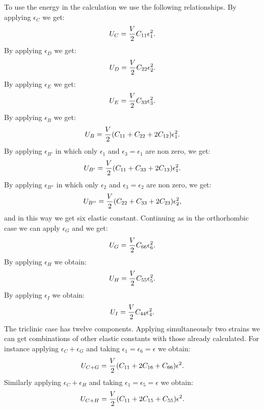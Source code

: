 \documentclass[12pt,a4paper,twoside]{report}
\begin{document}
To use the energy in the calculation we use the following
relationships. By applying $\epsilon_C$ we get:
\begin{equation}
U_C= {V \over 2} C_{11} \epsilon_1^2.
\end{equation}
By applying $\epsilon_D$ we get:
\begin{equation}
U_D= {V \over 2} C_{22} \epsilon_2^2.
\end{equation}
By applying $\epsilon_E$ we get:
\begin{equation}
U_E= {V \over 2} C_{33} \epsilon_3^2.
\end{equation}
By applying $\epsilon_B$ we get:
\begin{equation}
U_B= {V \over 2} (C_{11} + C_{22} + 2 C_{12}) \epsilon_1^2.
\end{equation}
By applying $\epsilon_{B'}$ in which only $\epsilon_1$ and
$\epsilon_3=\epsilon_1$ are non zero, we get:
\begin{equation}
U_{B'}= {V \over 2} (C_{11} + C_{33} + 2 C_{13}) \epsilon_1^2.
\end{equation}
By applying $\epsilon_{B''}$ in which only $\epsilon_2$ and
$\epsilon_3=\epsilon_2$ are non zero, we get:
\begin{equation}
U_{B''}= {V \over 2} (C_{22} + C_{33} + 2 C_{23}) \epsilon_2^2,
\end{equation}
and in this way we get six elastic constant. Continuing as in the
orthorhombic case we can
apply $\epsilon_G$ and we get:
\begin{equation}
U_G= {V \over 2} C_{66} \epsilon_6^2.
\end{equation}
By applying $\epsilon_H$ we obtain:
\begin{equation}
U_H= {V \over 2} C_{55} \epsilon_5^2.
\end{equation}
By applying $\epsilon_I$ we obtain:
\begin{equation}
U_I= {V \over 2} C_{44} \epsilon_4^2.
\end{equation}
The triclinic case has twelve components. Applying simultaneously two strains
we can get combinations of other elastic constants with those already
calculated. For instance applying $\epsilon_C + \epsilon_G$ and taking
$\epsilon_1=\epsilon_6=\epsilon$ we obtain:
\begin{equation}
U_{C+G}= {V \over 2} (C_{11}+2 C_{16} + C_{66}) \epsilon^2.
\end{equation}
Similarly applying $\epsilon_C + \epsilon_H$ and taking $\epsilon_1=
\epsilon_5=\epsilon$ we obtain:
\begin{equation}
U_{C+H}= {V \over 2} (C_{11}+2 C_{15} + C_{55}) \epsilon^2.
\end{equation}
\end{document}
